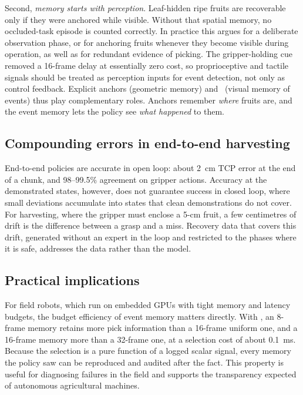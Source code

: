 Second, \emph{memory starts with perception}. Leaf-hidden ripe fruits are recoverable only if they were anchored while visible. Without that spatial memory, no occluded-task episode is counted correctly. In practice this argues for a deliberate observation phase, or for anchoring fruits whenever they become visible during operation, as well as for redundant evidence of picking. The gripper-holding cue removed a 16-frame delay at essentially zero cost, so proprioceptive and tactile signals should be treated as perception inputs for event detection, not only as control feedback. Explicit anchors (geometric memory) and \pekm\ (visual memory of events) thus play complementary roles. Anchors remember \emph{where} fruits are, and the event memory lets the policy see \emph{what happened} to them.

\subsection{Compounding errors in end-to-end harvesting}
End-to-end policies are accurate in open loop: about 2~cm TCP error at the end of a chunk, and 98--99.5\% agreement on gripper actions. Accuracy at the demonstrated states, however, does not guarantee success in closed loop, where small deviations accumulate into states that clean demonstrations do not cover. For harvesting, where the gripper must enclose a 5-cm fruit, a few centimetres of drift is the difference between a grasp and a miss. Recovery data that covers this drift, generated without an expert in the loop and restricted to the phases where it is safe, addresses the data rather than the model. 

\subsection{Practical implications}
For field robots, which run on embedded GPUs with tight memory and latency budgets, the budget efficiency of event memory matters directly. With \pekm, an 8-frame memory retains more pick information than a 16-frame uniform one, and a 16-frame memory more than a 32-frame one, at a selection cost of about 0.1~ms. Because the selection is a pure function of a logged scalar signal, every memory the policy saw can be reproduced and audited after the fact. This property is useful for diagnosing failures in the field and supports the transparency expected of autonomous agricultural machines.

